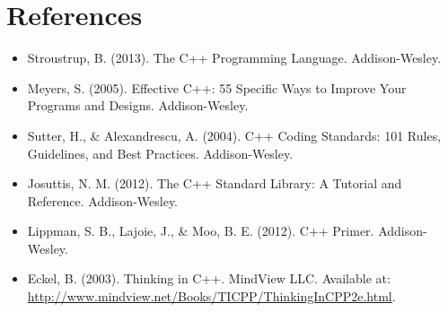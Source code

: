 \documentclass{article}
\begin{document}
\section*{References}
\begin{itemize}
    \item Stroustrup, B. (2013). The C++ Programming Language. Addison-Wesley.
    \item Meyers, S. (2005). Effective C++: 55 Specific Ways to Improve Your Programs and Designs. Addison-Wesley.
    \item Sutter, H., \& Alexandrescu, A. (2004). C++ Coding Standards: 101 Rules, Guidelines, and Best Practices. Addison-Wesley.
    \item Josuttis, N. M. (2012). The C++ Standard Library: A Tutorial and Reference. Addison-Wesley.
    \item Lippman, S. B., Lajoie, J., \& Moo, B. E. (2012). C++ Primer. Addison-Wesley.
    \item Eckel, B. (2003). Thinking in C++. MindView LLC. Available at: \url{http://www.mindview.net/Books/TICPP/ThinkingInCPP2e.html}.
\end{itemize}
\end{document}
